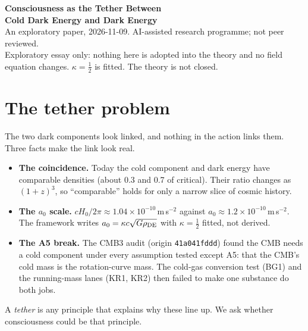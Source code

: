 \documentclass[10pt]{article}
\begin{document}
\begin{center}
{\Large\bfseries Consciousness as the Tether Between\\ Cold Dark Energy and Dark Energy}\\[6pt]
{\small An exploratory paper, 2026-11-09. AI-assisted research programme; not peer reviewed.\\
Exploratory essay only: nothing here is adopted into the theory and no field equation changes.
$\kappa=\tfrac12$ is fitted. The theory is not closed.}
\end{center}

\begin{abstract}\noindent
We ask whether consciousness could be what ties cold dark energy to dark energy, and split the question into three readings.
(1)~\emph{Causal}: minds move energy between the components or set their ratio. This fails by about 38 orders of magnitude in energy, and on timing and locality.
(2)~\emph{Selection}: observers can exist only in the epoch where the two densities are comparable. This is viable, recasts the coincidence problem as an observer-selection effect, and has a sharper form through $a_0=\kappa c\sqrt{G\rho_{\rm DE}}$; it does not explain why the CMB's cold mass is missing from rotation curves.
(3)~\emph{Bookkeeping}: the split into a cold part and a smooth part is drawn by the observer when fitting data. This is supported at the CMB and background level by the CMB3 audit, where only the assumption that CMB cold mass equals rotation-curve mass breaks; KR1, KR2 and BG1 show that it names the tether without building it.
Kill tests for each reading are listed. None has been run.
\end{abstract}

\section{The tether problem}
The two dark components look linked, and nothing in the action links them. Three facts make the link look real.
\begin{itemize}
\item \textbf{The coincidence.} Today the cold component and dark energy have comparable densities (about 0.3 and 0.7 of critical). Their ratio changes as $(1+z)^3$, so ``comparable'' holds for only a narrow slice of cosmic history.
\item \textbf{The $a_0$ scale.} $cH_0/2\pi\approx1.04\times10^{-10}$\,m\,s$^{-2}$ against $a_0\approx1.2\times10^{-10}$\,m\,s$^{-2}$. The framework writes $a_0=\kappa c\sqrt{G\rho_{\rm DE}}$ with $\kappa=\tfrac12$ fitted, not derived.
\item \textbf{The A5 break.} The CMB3 audit (origin \texttt{41a041fddd}) found the CMB needs a cold component under every assumption tested except A5: that the CMB's cold mass is the rotation-curve mass. The cold-gas conversion test (BG1) and the running-mass lanes (KR1, KR2) then failed to make one substance do both jobs.
\end{itemize}
A \emph{tether} is any principle that explains why these line up. We ask whether consciousness could be that principle.
\end{document}
